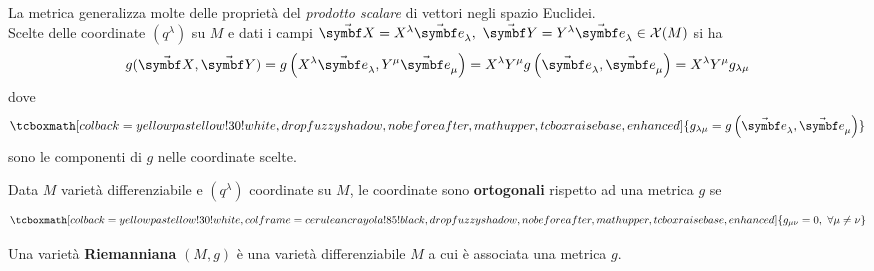 La metrica generalizza molte delle proprietà del \textit{prodotto scalare} di vettori negli spazio Euclidei.\\
Scelte delle coordinate $(q^\lambda)$ su $M$ e dati i campi $\vba{X}=X^{\lambda}\vba{e}_{\lambda},\ \vba{Y}=Y^{\lambda}\vba{e}_{\lambda}\in\mathcal{X}(M)$ si ha
\begin{equation*}
	g(\vba{X},\vba{Y})=g\left(X^\lambda\vba{e}_\lambda,Y^\mu\vba{e}_\mu\right)=X^\lambda Y^\mu g\left(\vba{e}_\lambda,\vba{e}_\mu\right)=X^\lambda Y^\mu g_{\lambda \mu}
\end{equation*}
dove
\begin{equation}
	\tcboxmath[colback=yellowpastellow!30!white,drop fuzzy shadow, nobeforeafter, math upper, tcbox raise base, enhanced]{g_{\lambda \mu}=g\left(\vba{e}_\lambda,\vba{e}_\mu\right)}
\end{equation}
sono le componenti di $g$ nelle coordinate scelte.
\begin{define}
	Data $M$ varietà differenziabile e $\left(q^\lambda\right)$ coordinate su $M$, le coordinate sono \textbf{ortogonali} rispetto ad una metrica $g$ se
	\begin{equation}
		\tcboxmath[colback=yellowpastellow!30!white,colframe=ceruleancrayola!85!black,drop fuzzy shadow, nobeforeafter, math upper, tcbox raise base, enhanced]{g_{\mu\nu}=0,\ \forall \mu\neq\nu}
	\end{equation}
\end{define}
\begin{define}
	Una varietà \textbf{Riemanniana} $\left(M,g\right)$ è una varietà differenziabile $M$ a cui è associata una metrica $g$.
\end{define}
